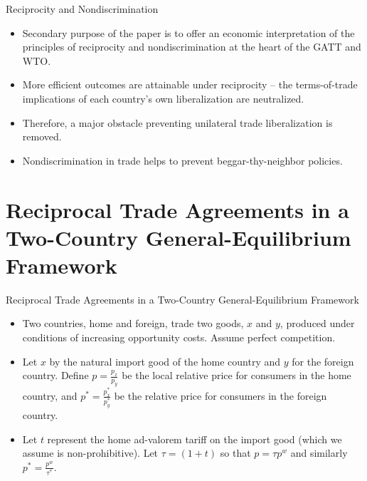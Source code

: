 \documentclass[aspectratio=169]{beamer}
\begin{document}
\begin{frame}{Reciprocity and Nondiscrimination}

\begin{itemize}
    \item<1-> Secondary purpose of the paper is to offer an economic interpretation of the principles of reciprocity and nondiscrimination at the heart of the GATT and WTO.
    \item<2-> More efficient outcomes are attainable under reciprocity – the terms-of-trade implications of each country’s own liberalization are neutralized.
    \item<3-> Therefore, a major obstacle preventing unilateral trade liberalization is removed.
    \item<4-> Nondiscrimination in trade helps to prevent beggar-thy-neighbor policies.
\end{itemize}
    
\end{frame}


\section{Reciprocal Trade Agreements in a Two-Country General-Equilibrium Framework}


\begin{frame}{Reciprocal Trade Agreements in a Two-Country General-Equilibrium Framework}

\begin{itemize}
    \item<1-> Two countries, home and foreign, trade two goods, $ x $ and $ y $, produced under conditions of increasing opportunity costs.  Assume perfect competition.
    \item<2-> Let $ x $ by the natural import good of the home country and $ y $ for the foreign country.  Define  $ p  = \frac{p_{x}}{p_{y}} $ be the local relative price for consumers in the home country, and $ p^{*} = \frac{p^{*}_{x}}{p^{*}_{y}} $ be the relative price for consumers in the foreign country.
    \item<3-> Let $ t $ represent the home ad-valorem tariff on the import good (which we assume is non-prohibitive).  Let $ \tau =  \left( 1 + t \right) $ so that $ p = \tau p^{w} $ and similarly $ p^{*} = \frac{p^{w}}{\tau^{*}} $. 
\end{itemize}
    
\end{frame}
\end{document}
